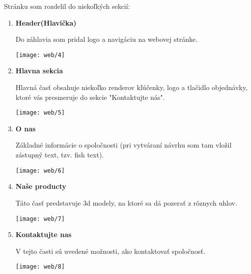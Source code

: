       Stránku som rozdelil do niekoľkých sekcií: \\

      \begin{enumerate}
        \item{
            \textbf{Header(Hlavička)}

            Do záhlavia som pridal logo a navigáciu na webovej stránke.

            \begin{center}
              \texttt{[image: web/4]}
            \end{center}
        }
        \item{
            \textbf{Hlavna sekcia}

            Hlavná časť obsahuje niekoľko renderov kľúčenky, logo a tlačidlo objednávky, ktoré vás presmeruje do sekcie "Kontaktujte nás".

            \begin{center}
              \texttt{[image: web/5]}
            \end{center}
        }
        \item{
            \textbf{O nas}

            Základné informácie o spoločnosti (pri vytváraní návrhu som tam vložil zástupný text, tzv. fish text).

            \begin{center}
              \texttt{[image: web/6]}
            \end{center}
        }
        \item{
            \textbf{Naše producty}

            Táto časť predstavuje 3d modely, na ktoré sa dá pozerať z rôznych uhlov.

            \begin{center}
              \texttt{[image: web/7]}
            \end{center}
        }
        \item{
            \textbf{Kontaktujte nas}

            V tejto časti sú uvedené možnosti, ako kontaktovať spoločnosť.

            \begin{center}
              \texttt{[image: web/8]}
            \end{center}
        }
      \end{enumerate}

